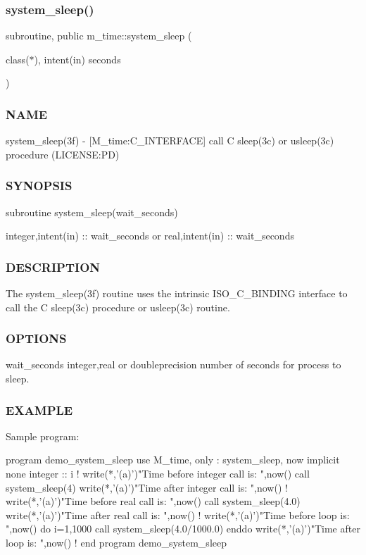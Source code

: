 \subsubsection{\texorpdfstring{system\+\_\+sleep()}{system\_sleep()}}
{\footnotesize\ttfamily subroutine, public m\+\_\+time\+::system\+\_\+sleep (\begin{DoxyParamCaption}\item[{class($\ast$), intent(in)}]{seconds }\end{DoxyParamCaption})}



\subsubsection*{N\+A\+ME}

system\+\_\+sleep(3f) -\/ \mbox{[}M\+\_\+time\+:C\+\_\+\+I\+N\+T\+E\+R\+F\+A\+CE\mbox{]} call C sleep(3c) or usleep(3c) procedure (L\+I\+C\+E\+N\+SE\+:PD) \subsubsection*{S\+Y\+N\+O\+P\+S\+IS}

subroutine system\+\_\+sleep(wait\+\_\+seconds)

integer,intent(in) \+:\+: wait\+\_\+seconds or real,intent(in) \+:\+: wait\+\_\+seconds

\subsubsection*{D\+E\+S\+C\+R\+I\+P\+T\+I\+ON}

The system\+\_\+sleep(3f) routine uses the intrinsic I\+S\+O\+\_\+\+C\+\_\+\+B\+I\+N\+D\+I\+NG interface to call the C sleep(3c) procedure or usleep(3c) routine.

\subsubsection*{O\+P\+T\+I\+O\+NS}

wait\+\_\+seconds integer,real or doubleprecision number of seconds for process to sleep.

\subsubsection*{E\+X\+A\+M\+P\+LE}

\begin{DoxyVerb}Sample program:

 program demo_system_sleep
 use M_time, only : system_sleep, now
 implicit none
 integer :: i
    !
    write(*,'(a)')"Time before integer call is: ",now()
    call system_sleep(4)
    write(*,'(a)')"Time after  integer call is: ",now()
    !
    write(*,'(a)')"Time before real call is: ",now()
    call system_sleep(4.0)
    write(*,'(a)')"Time after  real call is: ",now()
    !
    write(*,'(a)')"Time before loop is: ",now()
    do i=1,1000
       call system_sleep(4.0/1000.0)
    enddo
    write(*,'(a)')"Time after loop  is: ",now()
    !
 end program demo_system_sleep
\end{DoxyVerb}


